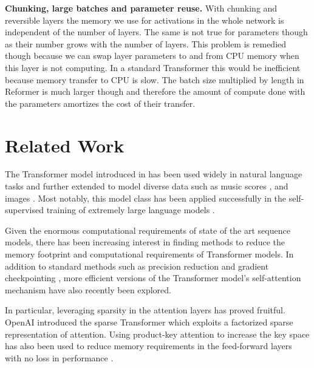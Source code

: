 \textbf{Chunking, large batches and parameter reuse.} With chunking and reversible layers the memory we use for activations in the whole network is independent of the number of layers. The same is not true for parameters though as their number grows with the number of layers. This problem is remedied though because we can swap layer parameters to and from CPU memory when this layer is not computing. In a standard Transformer this would be inefficient because memory transfer to CPU is slow. The batch size multiplied by length in Reformer is much larger though and therefore the amount of compute done with the parameters amortizes the cost of their transfer.

\section{Related Work} \label{sec:relwork}

The Transformer model introduced in \citep{transformer} has been used widely in natural language tasks and further extended to model diverse data such as music scores \citep{huang2018music}, and images \citep{parmar2018imagetransformer, ramachandran2019attentionimage}.  Most notably, this model class has been applied successfully in the self-supervised training of extremely large language models
\citep{devlin2018BERT, radford2019GPT2}.

Given the enormous computational requirements of state of the art sequence models, there has been increasing interest in finding methods to reduce the memory footprint and computational requirements of Transformer models.  In addition to standard methods such as precision reduction and gradient checkpointing \citep{sohoni2019lowmemory}, more efficient versions of the Transformer model's self-attention mechanism \citep{sukhbaatar2019adaptiveattn, sukhbaatar2019persistentmemory} have also recently been explored.

In particular, leveraging sparsity in the attention layers has proved fruitful. OpenAI introduced the sparse Transformer \citep{child2019sparsetransformer} which exploits a factorized sparse representation of attention.  Using product-key attention to increase the key space has also been used to reduce memory requirements in the feed-forward layers with no loss in performance \citep{lample2019productkeys}.

